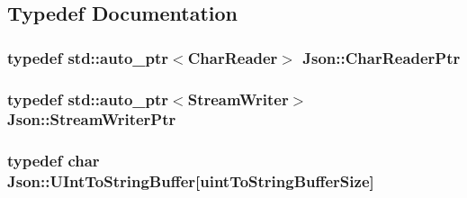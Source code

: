 \subsection{Typedef Documentation}
\hypertarget{namespaceJson_a4724efb8d41614b47036cb8b54233837}{
\subsubsection[{Char\-Reader\-Ptr}]{\setlength{\rightskip}{0pt plus 5cm}typedef std\-::auto\-\_\-ptr$<$Char\-Reader$>$ {\bf Json\-::\-Char\-Reader\-Ptr}}}\label{namespaceJson_a4724efb8d41614b47036cb8b54233837}
\hypertarget{namespaceJson_a7132404aeebfc96d7c6ad2c66260afb5}{
\subsubsection[{Stream\-Writer\-Ptr}]{\setlength{\rightskip}{0pt plus 5cm}typedef std\-::auto\-\_\-ptr$<$Stream\-Writer$>$ {\bf Json\-::\-Stream\-Writer\-Ptr}}}\label{namespaceJson_a7132404aeebfc96d7c6ad2c66260afb5}
\hypertarget{namespaceJson_a602bcf69c2042fb61c3b243cb16f04ca}{
\subsubsection[{U\-Int\-To\-String\-Buffer}]{\setlength{\rightskip}{0pt plus 5cm}typedef char Json\-::\-U\-Int\-To\-String\-Buffer\mbox{[}{\bf uint\-To\-String\-Buffer\-Size}\mbox{]}}}\label{namespaceJson_a602bcf69c2042fb61c3b243cb16f04ca}


